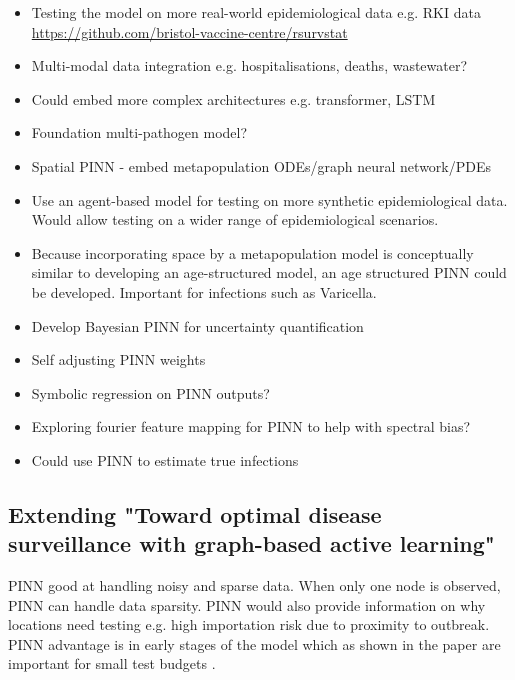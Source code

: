 \documentclass{article}
\begin{document}
\begin{itemize}
    \item Testing the model on more real-world epidemiological data e.g. RKI data \href{}{https://github.com/bristol-vaccine-centre/rsurvstat}
    \item Multi-modal data integration e.g. hospitalisations, deaths, wastewater?
    \item Could embed more complex architectures e.g. transformer, LSTM
    \item Foundation multi-pathogen model? \parencite{Lau2026}
    \item Spatial PINN - embed metapopulation ODEs/graph neural network/PDEs
    \item Use an agent-based model for testing on more synthetic epidemiological data. Would allow testing on a wider range of epidemiological scenarios.
    \item Because incorporating space by a metapopulation model is conceptually similar to developing an age-structured model, an age structured PINN could be developed. Important for infections such as Varicella.
    \item Develop Bayesian PINN for uncertainty quantification
    \item Self adjusting PINN weights \parencite{https://doi.org/10.48550/arxiv.2009.04544}
    \item Symbolic regression on PINN outputs?
    \item Exploring fourier feature mapping for PINN to help with spectral bias? \parencite{Ning2023}
    \item Could use PINN to estimate true infections 
    
\end{itemize}


\subsection{Extending "Toward optimal disease surveillance with graph-based active
learning"}

PINN good at handling noisy and sparse data. When only one node is observed, PINN can handle data sparsity. PINN would also provide information on why locations need testing e.g. high importation risk due to proximity to outbreak. PINN advantage is in early stages of the model which as shown in the paper are important for small test budgets \parencite{Tsui2024}.



\printbibliography
\end{document}
